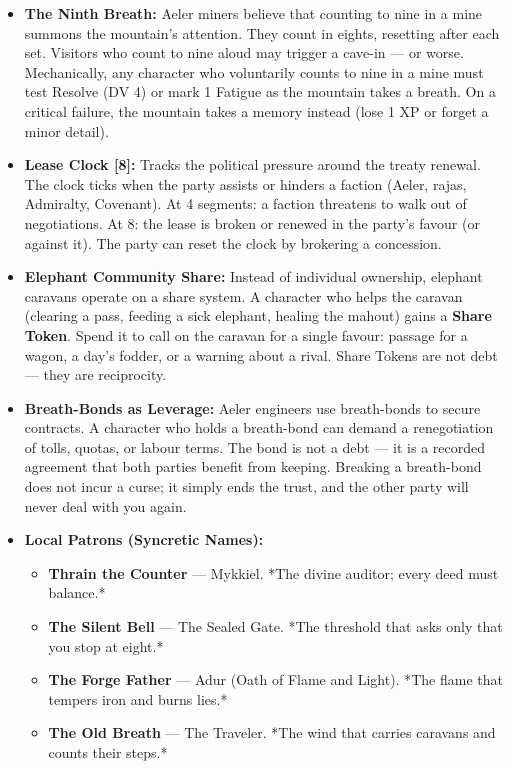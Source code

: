 \begin{itemize}
\item \textbf{The Ninth Breath:} Aeler miners believe that counting to nine in a mine summons the mountain's attention. They count in eights, resetting after each set. Visitors who count to nine aloud may trigger a cave-in — or worse. Mechanically, any character who voluntarily counts to nine in a mine must test Resolve (DV 4) or mark 1 Fatigue as the mountain takes a breath. On a critical failure, the mountain takes a memory instead (lose 1 XP or forget a minor detail).
\item \textbf{Lease Clock [8]:} Tracks the political pressure around the treaty renewal. The clock ticks when the party assists or hinders a faction (Aeler, rajas, Admiralty, Covenant). At 4 segments: a faction threatens to walk out of negotiations. At 8: the lease is broken or renewed in the party's favour (or against it). The party can reset the clock by brokering a concession.
\item \textbf{Elephant Community Share:} Instead of individual ownership, elephant caravans operate on a share system. A character who helps the caravan (clearing a pass, feeding a sick elephant, healing the mahout) gains a \textbf{Share Token}. Spend it to call on the caravan for a single favour: passage for a wagon, a day's fodder, or a warning about a rival. Share Tokens are not debt — they are reciprocity.
\item \textbf{Breath-Bonds as Leverage:} Aeler engineers use breath-bonds to secure contracts. A character who holds a breath-bond can demand a renegotiation of tolls, quotas, or labour terms. The bond is not a debt — it is a recorded agreement that both parties benefit from keeping. Breaking a breath-bond does not incur a curse; it simply ends the trust, and the other party will never deal with you again.
\item \textbf{Local Patrons (Syncretic Names):}
  \begin{itemize}
    \item \textbf{Thrain the Counter} — Mykkiel. *The divine auditor; every deed must balance.*
    \item \textbf{The Silent Bell} — The Sealed Gate. *The threshold that asks only that you stop at eight.*
    \item \textbf{The Forge Father} — Adur (Oath of Flame and Light). *The flame that tempers iron and burns lies.*
    \item \textbf{The Old Breath} — The Traveler. *The wind that carries caravans and counts their steps.*
  \end{itemize}
\end{itemize}

